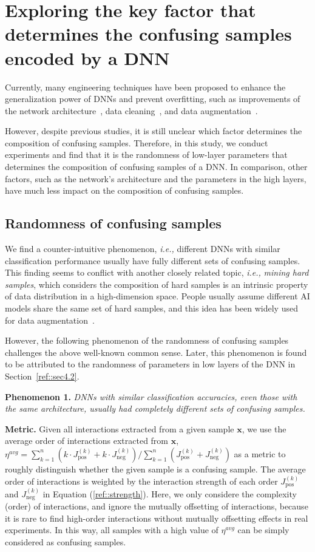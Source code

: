 \documentclass[10pt,twocolumn,letterpaper]{article}
\begin{document}
\section{Exploring  the key factor that determines the confusing samples encoded by a DNN}
Currently, many engineering techniques have been proposed to enhance the generalization power of DNNs and prevent overfitting, such as improvements of the network architecture~\cite{he2016deep}, data cleaning~\cite{northcutt2021confident}, and data augmentation~\cite{shorten2019survey}.

However, despite previous studies, it is still unclear which factor determines the composition of confusing samples.
Therefore, in this study,  we conduct experiments and find that it is the randomness of low-layer parameters that determines the composition of confusing samples of a DNN. In comparison, other factors, such as the network’s architecture and the parameters in the high layers, have much less impact on the composition of confusing samples.


\subsection{Randomness of confusing samples}\label{red::sec4.1}
We find a counter-intuitive phenomenon, \emph{i.e.,} different DNNs with similar classification performance usually have fully different sets of confusing samples. This finding seems to conflict with another closely related topic, \emph{i.e.,} \textit{mining hard samples}, which considers the composition of hard samples is an intrinsic property of data distribution in a high-dimension space.
People usually assume different AI models share the same set of hard samples, and this idea has been widely used for data augmentation~\cite{shrivastava2016training, smirnov2018hard, peng2018jointly}.


However, the following phenomenon of the randomness of confusing samples challenges the above well-known common sense.
Later, this phenomenon is found to be attributed to the randomness of parameters in low layers of the DNN in Section~\ref{ref::sec4.2}.


\textbf{Phenomenon 1.} \textit{DNNs with similar classification accuracies, even those with the same architecture, usually had completely different sets of confusing samples.
}

\textbf{Metric.} Given all interactions extracted from a given sample $\mathbf{x}$, we use the average order of interactions extracted from $\mathbf{x}$, $\eta^{avg} = \sum_{k=1}^{n} (k \cdot J_{\text{pos}}^{(k)} + k \cdot J_{\text{neg}}^{(k)}) / \sum_{k=1}^{n}(J_{\text{pos}}^{(k)} + J_{\text{neg}}^{(k)})$ as a metric to roughly distinguish whether the given sample is a confusing sample. The average order of interactions is weighted by the interaction strength of each order $J_{\text{pos}}^{(k)}$ and $J_{\text{neg}}^{(k)}$ in Equation (\ref{ref::strength}). Here, we only considere the complexity (order) of interactions, and ignore the mutually offsetting of interactions, because it is rare to find high-order interactions without mutually offsetting effects in real experiments. In this way, all samples with a high value of $\eta^{avg}$ can be simply considered as confusing samples.
\end{document}
